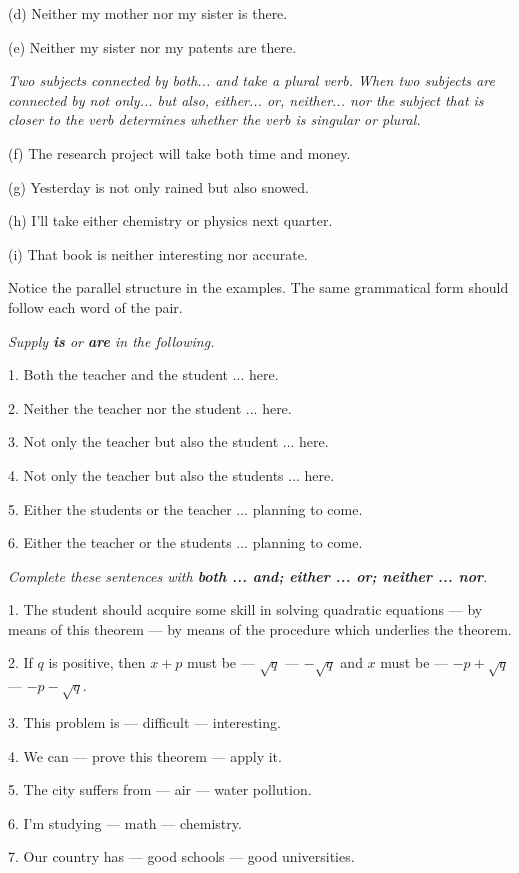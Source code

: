 \documentclass[a4paper]{article}
\begin{document}
(d) Neither my mother nor my sister is there.

(e) Neither my sister nor my patents are there.

\textit{Two subjects connected by both... and take a plural verb.
When two subjects are connected by not only... but also, either... or, neither... nor the subject that is closer to the verb
determines whether the verb is singular or plural.}

(f) The research project will take both time and money.

(g) Yesterday is not only rained but also snowed.

(h) I'll take either chemistry or physics next quarter.

(i) That book is neither interesting nor accurate.

Notice the parallel structure in the examples. The same grammatical form should follow each word of the pair.

\textit{Supply \textbf{is} or \textbf{are} in the following.}

1. Both the teacher and the student ... here.

2. Neither the teacher nor the student ... here.

3. Not only the teacher but also the student ... here.

4. Not only the teacher but also the students ... here.

5. Either the students or the teacher ... planning to come.

6. Either the teacher or the students ... planning to come.

\textit{Complete these sentences with \textbf{both ... and; either ... or; neither ... nor}.}

1. The student should acquire some skill in solving quadratic equations --- by means of this theorem --- by means of the
procedure which underlies the theorem.

2. If $q$ is positive, then $x + p$ must be --- $\sqrt{q}$ --- $-\sqrt{q}$ and $x$ must be --- $-p+\sqrt{q}$ --- $-p-\sqrt{q}$.

3. This problem is --- difficult --- interesting.

4. We can --- prove this theorem --- apply it.

5. The city suffers from --- air --- water pollution.

6. I'm studying --- math --- chemistry.

7. Our country has --- good schools --- good universities.
\end{document}
